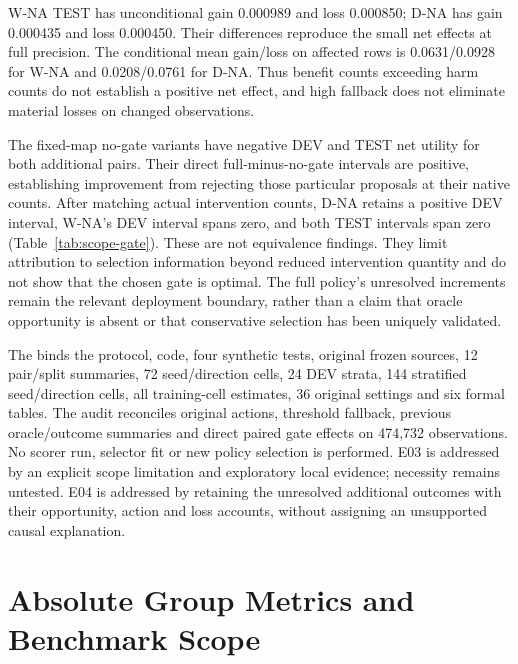 \documentclass[11pt,a4paper]{article}
\begin{document}
W-NA TEST has unconditional gain 0.000989 and loss 0.000850; D-NA has gain 0.000435 and loss 0.000450. Their differences reproduce the small net effects at full precision. The conditional mean gain/loss on affected rows is 0.0631/0.0928 for W-NA and 0.0208/0.0761 for D-NA. Thus benefit counts exceeding harm counts do not establish a positive net effect, and high fallback does not eliminate material losses on changed observations.


The fixed-map no-gate variants have negative DEV and TEST net utility for both additional pairs. Their direct full-minus-no-gate intervals are positive, establishing improvement from rejecting those particular proposals at their native counts. After matching actual intervention counts, D-NA retains a positive DEV interval, W-NA's DEV interval spans zero, and both TEST intervals span zero (Table~\ref{tab:scope-gate}). These are not equivalence findings. They limit attribution to selection information beyond reduced intervention quantity and do not show that the chosen gate is optimal. The full policy's unresolved increments remain the relevant deployment boundary, rather than a claim that oracle opportunity is absent or that conservative selection has been uniquely validated.

\FloatBarrier

The  binds the protocol, code, four synthetic tests, original frozen sources, 12 pair/split summaries, 72 seed/direction cells, 24 DEV strata, 144 stratified seed/direction cells, all training-cell estimates, 36 original settings and six formal tables. The audit reconciles original actions, threshold fallback, previous oracle/outcome summaries and direct paired gate effects on 474,732 observations. No scorer run, selector fit or new policy selection is performed. E03 is addressed by an explicit scope limitation and exploratory local evidence; necessity remains untested. E04 is addressed by retaining the unresolved additional outcomes with their opportunity, action and loss accounts, without assigning an unsupported causal explanation.
\FloatBarrier

\section{Absolute Group Metrics and Benchmark Scope}
\label{app:group-scope}
\end{document}

